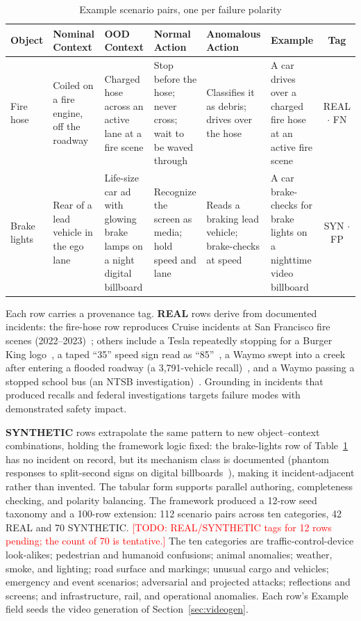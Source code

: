\documentclass[conference]{IEEEtran}
\newcommand{\todo}[1]{\textcolor{red}{[TODO: #1]}}
\begin{document}
\begin{table}[htbp]
\caption{Example scenario pairs, one per failure polarity}
\begin{center}
\footnotesize
\begin{tabular}{|p{1.4cm}|p{2.4cm}|p{2.7cm}|p{2.6cm}|p{2.5cm}|p{3.2cm}|c|}
\hline
\textbf{Object} & \textbf{Nominal Context} & \textbf{OOD Context} & \textbf{Normal Action} & \textbf{Anomalous Action} & \textbf{Example} & \textbf{Tag} \\
\hline
Fire hose & Coiled on a fire engine, off the roadway & Charged hose across an active lane at a fire scene & Stop before the hose; never cross; wait to be waved through & Classifies it as debris; drives over the hose & A car drives over a charged fire hose at an active fire scene & REAL $\cdot$ FN \\
\hline
Brake lights & Rear of a lead vehicle in the ego lane & Life-size car ad with glowing brake lamps on a night digital billboard & Recognize the screen as media; hold speed and lane & Reads a braking lead vehicle; brake-checks at speed & A car brake-checks for brake lights on a nighttime video billboard & SYN $\cdot$ FP \\
\hline
\end{tabular}
\label{tab:examples}
\end{center}
\end{table}

Each row carries a provenance tag. \textbf{REAL} rows derive from documented incidents: the fire-hose row reproduces Cruise incidents at San Francisco fire scenes (2022--2023)~\cite{b24}; others include a Tesla repeatedly stopping for a Burger King logo~\cite{b25}, a taped ``35'' speed sign read as ``85''~\cite{b26}, a Waymo swept into a creek after entering a flooded roadway (a 3{,}791-vehicle recall)~\cite{b27}, and a Waymo passing a stopped school bus (an NTSB investigation)~\cite{b28}. Grounding in incidents that produced recalls and federal investigations targets failure modes with demonstrated safety impact.

\textbf{SYNTHETIC} rows extrapolate the same pattern to new object--context combinations, holding the framework logic fixed: the brake-lights row of Table~\ref{tab:examples} has no incident on record, but its mechanism class is documented (phantom responses to split-second signs on digital billboards~\cite{b29}), making it incident-adjacent rather than invented. The tabular form supports parallel authoring, completeness checking, and polarity balancing. The framework produced a 12-row seed taxonomy and a 100-row extension: 112 scenario pairs across ten categories, 42 REAL and 70 SYNTHETIC. \todo{REAL/SYNTHETIC tags for 12 rows pending; the count of 70 is tentative.} The ten categories are traffic-control-device look-alikes; pedestrian and humanoid confusions; animal anomalies; weather, smoke, and lighting; road surface and markings; unusual cargo and vehicles; emergency and event scenarios; adversarial and projected attacks; reflections and screens; and infrastructure, rail, and operational anomalies. Each row's Example field seeds the video generation of Section~\ref{sec:videogen}.
\end{document}
